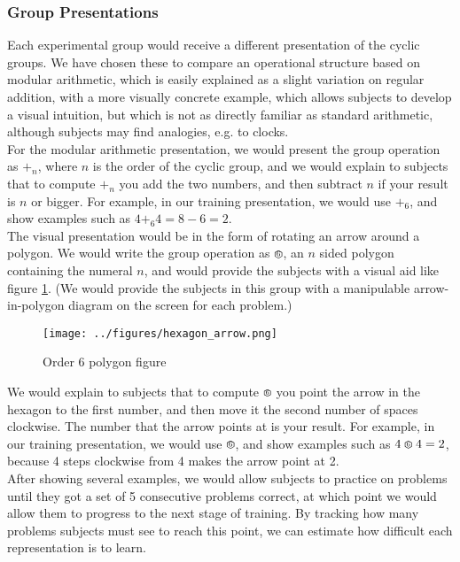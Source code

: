 \documentclass[11pt]{article}
\def\hex{\mathrel{%
    \mathchoice{\HEX}{\HEX}{\scriptsize\HEX}{\tiny\HEX}%
}}
\def\HEX{{%
    \setbox0\hbox{\varhexagon}%
    \rlap{\hbox to \wd0{\hss\raisebox{1 pt}{\scaleobj{0.6}{6}}\hss}}\box0
}}
\begin{document}
\subsubsection{Group Presentations}
Each experimental group would receive a different presentation of the cyclic groups. We have chosen these to compare an operational structure based on modular arithmetic, which is easily explained as a slight variation on regular addition, with a more visually concrete example, which allows subjects to develop a visual intuition, but which is not as directly familiar as standard arithmetic, although subjects may find analogies, e.g. to clocks. \\[11pt] 
For the modular arithmetic presentation, we would present the group operation as $+_n$, where $n$ is the order of the cyclic group, and we would explain to subjects that to compute $+_n$ you add the two numbers, and then subtract $n$ if your result is $n$ or bigger. For example, in our training presentation, we would use $+_6$, and show examples such as $4 +_6 4 = 8 - 6 = 2$. \\[11pt]
The visual presentation would be in the form of rotating an arrow around a polygon. We would write the group operation as $\hex$, an $n$ sided polygon containing the numeral $n$, and would provide the subjects with a visual aid like figure \ref{hexagonex}. (We would provide the subjects in this group with a manipulable arrow-in-polygon diagram on the screen for each problem.)
\begin{figure}[H] \centering \texttt{[image: ../figures/hexagon\_arrow.png]} \caption{Order 6 polygon figure} \label{hexagonex} \end{figure} \noindent
We would explain to subjects that to compute $\hex$ you point the arrow in the hexagon to the first number, and then move it the second number of spaces clockwise. The number that the arrow points at is your result. For example, in our training presentation, we would use $\hex$, and show examples such as $4 \hex 4 = 2$, because 4 steps clockwise from 4 makes the arrow point at 2. \\[11pt]
After showing several examples, we would allow subjects to practice on problems until they got a set of 5 consecutive problems correct, at which point we would allow them to progress to the next stage of training. By tracking how many problems subjects must see to reach this point, we can estimate how difficult each representation is to learn.
\end{document}
